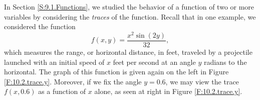 In Section \ref{S:9.1.Functions}, we studied the behavior
of a function of two or more variables by considering the {\em traces}
of the function.  Recall that in one example, we considered the function
$$
f(x,y) = \frac{x^2 \sin(2 y)}{32},
$$
which measures the range, or horizontal distance, in feet, traveled by a
projectile launched with an initial 
speed of $x$ feet per second at an angle $y$ radians to the
horizontal.  The graph of this function is given again on the left in Figure
\ref{F:10.2.trace.y}.  Moreover, if we fix the angle $y = 0.6$, we may view the trace $f(x,0.6)$ as a
function of $x$ alone, as seen at right in Figure \ref{F:10.2.trace.y}.  


